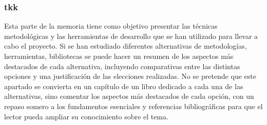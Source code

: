\subsubsection{tkk}

Esta parte de la memoria tiene como objetivo presentar las técnicas metodológicas y las herramientas de desarrollo que se han utilizado para llevar a cabo el proyecto. Si se han estudiado diferentes alternativas de metodologías, herramientas, bibliotecas se puede hacer un resumen de los aspectos más destacados de cada alternativa, incluyendo comparativas entre las distintas opciones y una justificación de las elecciones realizadas. 
No se pretende que este apartado se convierta en un capítulo de un libro dedicado a cada una de las alternativas, sino comentar los aspectos más destacados de cada opción, con un repaso somero a los fundamentos esenciales y referencias bibliográficas para que el lector pueda ampliar su conocimiento sobre el tema.


